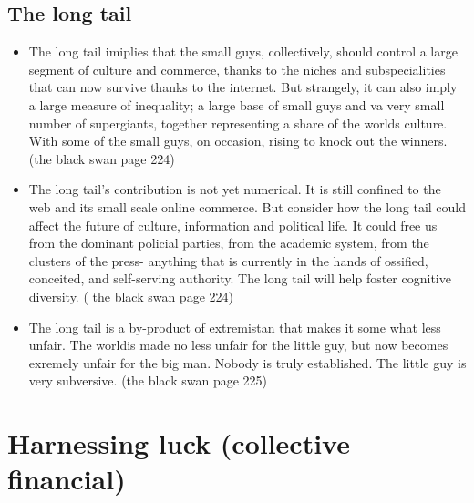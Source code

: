 \documentclass[11pt]{article}
\begin{document}
\subsection{The long tail}
\begin{itemize}
 \item  The long tail imiplies that the small guys, collectively, should control a large segment of culture and commerce, thanks to the niches and subspecialities that can now survive thanks to the internet. But strangely, it can also imply a large measure of inequality; a large base of small guys and va very small number of supergiants, together representing a share of the worlds culture. With some of the small guys, on occasion, rising to knock out the winners. (the black swan page 224)
 \item The long tail's contribution is not yet numerical. It is still confined to the web and its small scale online commerce. But consider how the long tail could affect the future of culture, information and political life. It could free us from the dominant policial parties, from the academic system, from the clusters of the press- anything that is currently in the hands of ossified, conceited, and self-serving authority. The long tail will help foster cognitive diversity. ( the black swan page 224)
 \item The long tail is a by-product of extremistan that makes it some what less unfair. The worldis made no less unfair for the little guy, but now becomes exremely unfair for the big man. Nobody is truly established. The little guy is very subversive. (the black swan page 225)
\end{itemize}
\section{Harnessing luck (collective financial)}
\end{document}
